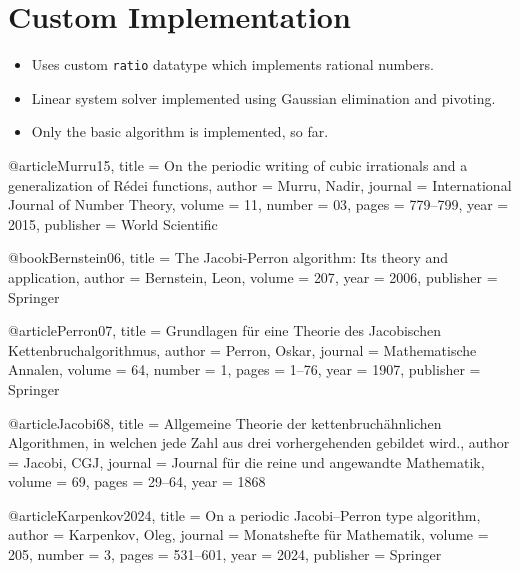 \documentclass[english,version-2020-11]{uzl-thesis}
\begin{document}
\section{Custom Implementation}

\begin{itemize}
  \item Uses custom \texttt{ratio} datatype which implements rational numbers.
  \item Linear system solver implemented using Gaussian elimination and pivoting.
  \item Only the basic algorithm is implemented, so far.
\end{itemize}


\begin{bibtex-entries}
@article{Murru15,
  title     = {On the periodic writing of cubic irrationals and a generalization of R{\'e}dei functions},
  author    = {Murru, Nadir},
  journal   = {International Journal of Number Theory},
  volume    = {11},
  number    = {03},
  pages     = {779--799},
  year      = {2015},
  publisher = {World Scientific}
}

@book{Bernstein06,
  title     = {The Jacobi-Perron algorithm: Its theory and application},
  author    = {Bernstein, Leon},
  volume    = {207},
  year      = {2006},
  publisher = {Springer}
}

@article{Perron07,
  title     = {Grundlagen f{\"u}r eine Theorie des Jacobischen Kettenbruchalgorithmus},
  author    = {Perron, Oskar},
  journal   = {Mathematische Annalen},
  volume    = {64},
  number    = {1},
  pages     = {1--76},
  year      = {1907},
  publisher = {Springer}
}

@article{Jacobi68,
  title   = {Allgemeine Theorie der kettenbruch{\"a}hnlichen Algorithmen, in welchen jede Zahl aus drei vorhergehenden gebildet wird.},
  author  = {Jacobi, CGJ},
  journal = {Journal f{\"u}r die reine und angewandte Mathematik},
  volume  = {69},
  pages   = {29--64},
  year    = {1868}
}

@article{Karpenkov2024,
  title     = {On a periodic Jacobi--Perron type algorithm},
  author    = {Karpenkov, Oleg},
  journal   = {Monatshefte f{\"u}r Mathematik},
  volume    = {205},
  number    = {3},
  pages     = {531--601},
  year      = {2024},
  publisher = {Springer}
}
\end{bibtex-entries}
\end{document}
